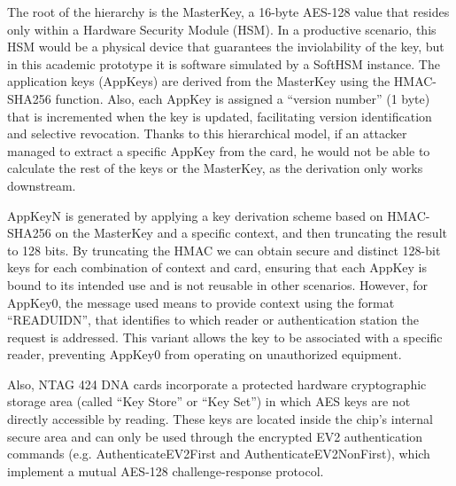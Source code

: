 The root of the hierarchy is the MasterKey, a 16-byte AES-128 value that resides
only within a Hardware Security Module (HSM). In a productive scenario, this HSM
would be a physical device that guarantees the inviolability of the key, but in this
academic prototype it is software simulated by a SoftHSM instance. The application
keys (AppKeys) are derived from the MasterKey using the HMAC-SHA256 function.
Also, each AppKey is assigned a “version number” (1 byte) that is incremented when
the key is updated, facilitating version identification and selective revocation. Thanks
to this hierarchical model, if an attacker managed to extract a specific AppKey from
the card, he would not be able to calculate the rest of the keys or the MasterKey, as
the derivation only works downstream.

AppKeyN is generated by applying a key derivation scheme based on
HMAC-SHA256 on the MasterKey and a specific context, and then truncating the
result to 128 bits. By truncating the HMAC we can obtain secure and distinct 128-bit
keys for each combination of context and card, ensuring that each AppKey is bound
to its intended use and is not reusable in other scenarios. However, for AppKey0, the
message used means to provide context using the format “READUIDN”, that
identifies to which reader or authentication station the request is addressed. This
variant allows the key to be associated with a specific reader, preventing AppKey0
from operating on unauthorized equipment.

Also, NTAG 424 DNA cards incorporate a protected hardware cryptographic storage
area (called “Key Store” or “Key Set”) \cite{ref29} in which AES keys are not directly
accessible by reading. These keys are located inside the chip's internal secure area
and can only be used through the encrypted EV2 authentication commands (e.g.
AuthenticateEV2First and AuthenticateEV2NonFirst), which implement a mutual
AES-128 challenge-response protocol.

